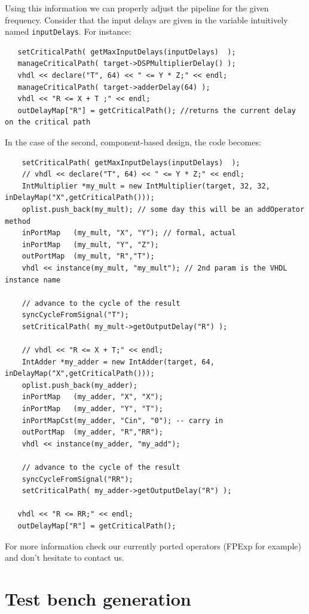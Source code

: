 \documentclass{article}
\begin{document}
Using this information we can properly adjust the pipeline for the given frequency.
Consider that the input delays are given in the variable intuitively named 
\verb!inputDelays!. For instance:

\begin{verbatim}
   setCriticalPath( getMaxInputDelays(inputDelays)  );
   manageCriticalPath( target->DSPMultiplierDelay() );
   vhdl << declare("T", 64) << " <= Y * Z;" << endl;
   manageCriticalPath( target->adderDelay(64) );
   vhdl << "R <= X + T ;" << endl;
   outDelayMap["R"] = getCriticalPath(); //returns the current delay on the critical path
\end{verbatim}

In the case of the second, component-based design, the code becomes:

\begin{verbatim}
	setCriticalPath( getMaxInputDelays(inputDelays)  );
	// vhdl << declare("T", 64) << " <= Y * Z;" << endl;
	IntMultiplier *my_mult = new IntMultiplier(target, 32, 32, inDelayMap("X",getCriticalPath()));
	oplist.push_back(my_mult); // some day this will be an addOperator method
	inPortMap   (my_mult, "X", "Y"); // formal, actual
	inPortMap   (my_mult, "Y", "Z");
	outPortMap  (my_mult, "R","T");
	vhdl << instance(my_mult, "my_mult"); // 2nd param is the VHDL instance name

	// advance to the cycle of the result
	syncCycleFromSignal("T"); 
	setCriticalPath( my_mult->getOutputDelay("R") );
	
	// vhdl << "R <= X + T;" << endl;
	IntAdder *my_adder = new IntAdder(target, 64, inDelayMap("X",getCriticalPath()));
	oplist.push_back(my_adder);
	inPortMap   (my_adder, "X", "X");
	inPortMap   (my_adder, "Y", "T");
	inPortMapCst(my_adder, "Cin", "0"); -- carry in
	outPortMap  (my_adder, "R","RR");
	vhdl << instance(my_adder, "my_add");

	// advance to the cycle of the result
	syncCycleFromSignal("RR"); 
	setCriticalPath( my_adder->getOutputDelay("R") );
	
   vhdl << "R <= RR;" << endl; 
   outDelayMap["R"] = getCriticalPath();
\end{verbatim}

For more information check our currently ported operators (FPExp for example) and
don't hesitate to contact us.


\section{Test bench generation}
\end{document}
